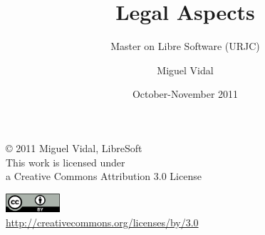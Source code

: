 \documentclass{beamer}
\begin{document}
\title{Legal Aspects}
\subtitle{Master on Libre Software (URJC)}
\author{Miguel Vidal} 
\date{October-November 2011}


\begin{frame}
  \vspace{2cm}
  \begin{flushright}
    {\small \copyright{} 2011 Miguel Vidal, LibreSoft} \\
    \medskip
    {\scriptsize This work is licensed under \\ a Creative Commons Attribution 3.0 License}
  \end{flushright}
  \begin{flushright}
    \href{http://creativecommons.org/licenses/by/3.0/es}{\includegraphics[width=2cm]{format/cc-by.png}} \\
    {\tiny \url{http://creativecommons.org/licenses/by/3.0}}
  \end{flushright}
\end{frame}%

\usebackgroundtemplate{}





\normalsize







\end{document}
